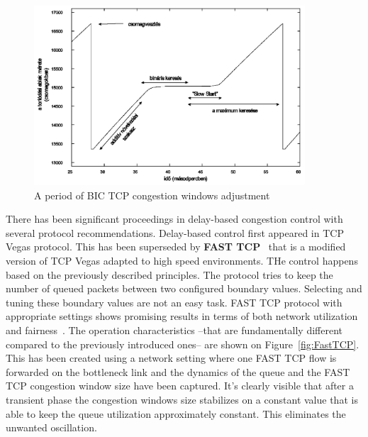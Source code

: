 \documentclass[a4paper]{article}
\begin{document}
\begin{figure}[H]
    \centering
    \includegraphics[width=0.9\textwidth]{figures/BICTCP.png}
    \caption{A period of BIC TCP congestion windows adjustment}
    \label{fig:bictcp}
\end{figure}

There has been significant proceedings in delay-based congestion control with several protocol recommendations.
Delay-based control first appeared in TCP Vegas protocol. This has been superseded by \textbf{FAST TCP}~\cite{FastTCP}
that is a modified version of TCP Vegas adapted to high speed environments. THe control happens based on the previously
described principles. The protocol tries to keep the number of queued packets between two configured boundary values.
Selecting and tuning these boundary values are not an easy task. FAST TCP protocol with appropriate settings shows
promising results in terms of both network utilization and fairness~\cite{TCPFairnessAnalysis}. The operation
characteristics --that are fundamentally different compared to the previously introduced ones-- are shown on
Figure~\ref{fig:FastTCP}. This has been created using a network setting where one FAST TCP flow is forwarded on the
bottleneck link and the dynamics of the queue and the FAST TCP congestion window size have been captured. It's clearly
visible that after a transient phase the congestion windows size stabilizes on a constant value that is able to keep
the queue utilization approximately constant. This eliminates the unwanted oscillation.
\end{document}
